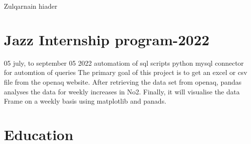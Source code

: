 \documentclass[
	10pt, %
]{FreemanCV}
\begin{document}
\begin{paracol}{2} %


\parbox[][0.11\textheight][c]{\linewidth}{ %
	\centering %
	
	{\sffamily\Huge Zulqarnain hiader} %
	
	\medskip %
	
	{\cursivefont\Huge\textcolor{headings}{ }}
	
	\vfill %
}



\section{Jazz Internship program-2022}





\jobentry
	{05 july, to september 05 2022} %
	{automatiom of sql scripts} %
	{} %
	{python mysql connector for automtion of queries } %
	{The primary goal of this project is to get an excel or csv file from the openaq website. After retrieving the data set from openaq, pandas analyses the data for weekly increases in No2. Finally, it will visualise the data Frame on a weekly basis using matplotlib and panads.} %


\section{Education} 


\end{paracol}
\end{document}
